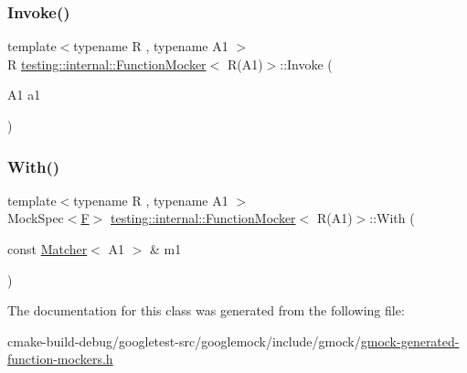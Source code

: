 \subsubsection{\texorpdfstring{Invoke()}{Invoke()}}
{\footnotesize\ttfamily template$<$typename R , typename A1 $>$ \\
R \mbox{\hyperlink{classtesting_1_1internal_1_1FunctionMocker}{testing\+::internal\+::\+Function\+Mocker}}$<$ R(A1)$>$\+::Invoke (\begin{DoxyParamCaption}\item[{A1}]{a1 }\end{DoxyParamCaption})\hspace{0.3cm}{\ttfamily [inline]}}

\mbox{\label{classtesting_1_1internal_1_1FunctionMocker_3_01R_07A1_08_4_acad7b9da099d38f5e37b63c430374cc8}} 
\subsubsection{\texorpdfstring{With()}{With()}}
{\footnotesize\ttfamily template$<$typename R , typename A1 $>$ \\
Mock\+Spec$<$\mbox{\hyperlink{classtesting_1_1internal_1_1FunctionMocker_3_01R_07A1_08_4_ada54286442ab14a18c2308cef748848f}{F}}$>$ \mbox{\hyperlink{classtesting_1_1internal_1_1FunctionMocker}{testing\+::internal\+::\+Function\+Mocker}}$<$ R(A1)$>$\+::With (\begin{DoxyParamCaption}\item[{const \mbox{\hyperlink{classtesting_1_1Matcher}{Matcher}}$<$ A1 $>$ \&}]{m1 }\end{DoxyParamCaption})\hspace{0.3cm}{\ttfamily [inline]}}



The documentation for this class was generated from the following file\+:\begin{DoxyCompactItemize}
\item 
cmake-\/build-\/debug/googletest-\/src/googlemock/include/gmock/\mbox{\hyperlink{gmock-generated-function-mockers_8h}{gmock-\/generated-\/function-\/mockers.\+h}}\end{DoxyCompactItemize}
